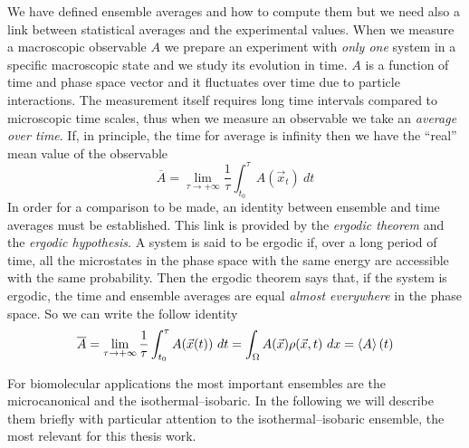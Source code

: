 We have defined ensemble averages and how to compute them but we need also a link between statistical averages
and the experimental values. When we measure a macroscopic observable $A$ we prepare an experiment with
\textit{only one} system in a specific macroscopic state and we study its evolution in time. $A$ is a function of
time and phase space vector and it fluctuates over time due to particle interactions. The measurement itself
requires long time intervals compared to microscopic time scales, thus when we measure an observable we take an
\textit{average over time}. If, in principle, the time for average is infinity then we have the ``real'' mean
value of the observable
\begin{equation*}
	\overline{A} = \lim_{\tau\to +\infty}\frac{1}{\tau}\int_{t_0}^\tau A(\vec x_t)\ dt
\end{equation*}
In order for a comparison to be made, an identity between ensemble and time averages must be established.
This link is provided by the \textit{ergodic theorem} and the \textit{ergodic hypothesis}. A system is said to be
ergodic if, over a long period of time, all the microstates in the phase space with the same energy are
accessible with the same probability. Then the ergodic theorem says that, if the system is ergodic, the time and
ensemble averages are equal \textit{almost everywhere} in the phase space. So we can write the follow identity
\begin{equation}
	\overline{A} = \lim_{\tau\to +\infty}\frac{1}{\tau}\int_{t_0}^\tau A(\vec x(t))\ dt = \int_\Omega A(\vec x)\rho(\vec x, t)\ dx = \left \langle A \right \rangle(t)
	\label{eq:ergotic}
\end{equation}

For biomolecular applications the most important ensembles are the microcanonical and the isothermal--isobaric.
In the following we will describe them briefly with particular attention to the isothermal--isobaric ensemble,
the most relevant for this thesis work.

